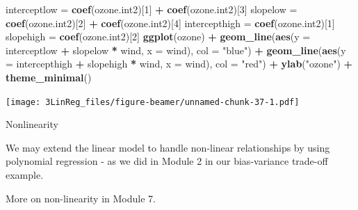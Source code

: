 \documentclass[10pt,ignorenonframetext,]{beamer}
\newenvironment{Shaded}{\begin{snugshade}}{\end{snugshade}}
\newcommand{\KeywordTok}[1]{\textcolor[rgb]{0.13,0.29,0.53}{\textbf{#1}}}
\newcommand{\DataTypeTok}[1]{\textcolor[rgb]{0.13,0.29,0.53}{#1}}
\newcommand{\DecValTok}[1]{\textcolor[rgb]{0.00,0.00,0.81}{#1}}
\newcommand{\StringTok}[1]{\textcolor[rgb]{0.31,0.60,0.02}{#1}}
\newcommand{\OperatorTok}[1]{\textcolor[rgb]{0.81,0.36,0.00}{\textbf{#1}}}
\newcommand{\NormalTok}[1]{#1}
\begin{document}
\begin{frame}[fragile]

\footnotesize

\begin{Shaded}
\begin{Highlighting}[]
\NormalTok{interceptlow =}\StringTok{ }\KeywordTok{coef}\NormalTok{(ozone.int2)[}\DecValTok{1}\NormalTok{] }\OperatorTok{+}\StringTok{ }\KeywordTok{coef}\NormalTok{(ozone.int2)[}\DecValTok{3}\NormalTok{]}
\NormalTok{slopelow =}\StringTok{ }\KeywordTok{coef}\NormalTok{(ozone.int2)[}\DecValTok{2}\NormalTok{] }\OperatorTok{+}\StringTok{ }\KeywordTok{coef}\NormalTok{(ozone.int2)[}\DecValTok{4}\NormalTok{]}
\NormalTok{intercepthigh =}\StringTok{ }\KeywordTok{coef}\NormalTok{(ozone.int2)[}\DecValTok{1}\NormalTok{]}
\NormalTok{slopehigh =}\StringTok{ }\KeywordTok{coef}\NormalTok{(ozone.int2)[}\DecValTok{2}\NormalTok{]}
\KeywordTok{ggplot}\NormalTok{(ozone) }\OperatorTok{+}\StringTok{ }\KeywordTok{geom_line}\NormalTok{(}\KeywordTok{aes}\NormalTok{(}\DataTypeTok{y =}\NormalTok{ interceptlow }\OperatorTok{+}\StringTok{ }\NormalTok{slopelow }\OperatorTok{*}\StringTok{ }\NormalTok{wind, }\DataTypeTok{x =}\NormalTok{ wind), }
    \DataTypeTok{col =} \StringTok{"blue"}\NormalTok{) }\OperatorTok{+}\StringTok{ }\KeywordTok{geom_line}\NormalTok{(}\KeywordTok{aes}\NormalTok{(}\DataTypeTok{y =}\NormalTok{ intercepthigh }\OperatorTok{+}\StringTok{ }\NormalTok{slopehigh }\OperatorTok{*}\StringTok{ }\NormalTok{wind, }
    \DataTypeTok{x =}\NormalTok{ wind), }\DataTypeTok{col =} \StringTok{"red"}\NormalTok{) }\OperatorTok{+}\StringTok{ }\KeywordTok{ylab}\NormalTok{(}\StringTok{"ozone"}\NormalTok{) }\OperatorTok{+}\StringTok{ }\KeywordTok{theme_minimal}\NormalTok{()}
\end{Highlighting}
\end{Shaded}

\texttt{[image: 3LinReg\_files/figure-beamer/unnamed-chunk-37-1.pdf]}

\normalsize

\end{frame}

\begin{frame}

\begin{block}{Nonlinearity}

We may extend the linear model to handle non-linear relationships by
using polynomial regression - as we did in Module 2 in our bias-variance
trade-off example.

More on non-linearity in Module 7.

\end{block}

\end{frame}
\end{document}
